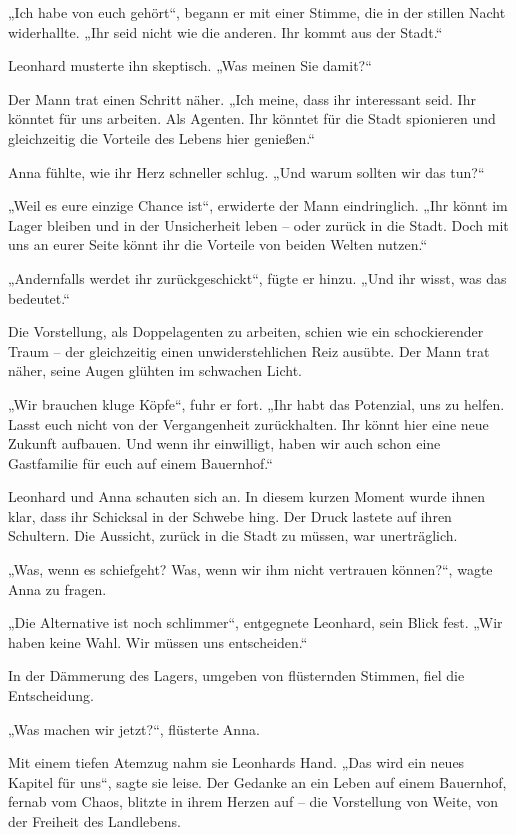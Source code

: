 \documentclass[
]{article}
\begin{document}
„Ich habe von euch gehört``, begann er mit einer Stimme, die in der stillen Nacht widerhallte. „Ihr seid nicht wie die anderen. Ihr kommt aus der Stadt.``

Leonhard musterte ihn skeptisch. „Was meinen Sie damit?{\kern0pt}``

Der Mann trat einen Schritt näher. „Ich meine, dass ihr interessant seid. Ihr könntet für uns arbeiten. Als Agenten. Ihr könntet für die Stadt spionieren und gleichzeitig die Vorteile des Lebens hier genießen.``

Anna fühlte, wie ihr Herz schneller schlug. „Und warum sollten wir das tun?{\kern0pt}``

„Weil es eure einzige Chance ist``, erwiderte der Mann eindringlich. „Ihr könnt im Lager bleiben und in der Unsicherheit leben -- oder zurück in die Stadt. Doch mit uns an eurer Seite könnt ihr die Vorteile von beiden Welten nutzen.``

„Andernfalls werdet ihr zurückgeschickt``, fügte er hinzu. „Und ihr wisst, was das bedeutet.``

Die Vorstellung, als Doppelagenten zu arbeiten, schien wie ein schockierender Traum -- der gleichzeitig einen unwiderstehlichen Reiz ausübte. Der Mann trat näher, seine Augen glühten im schwachen Licht.

„Wir brauchen kluge Köpfe``, fuhr er fort. „Ihr habt das Potenzial, uns zu helfen. Lasst euch nicht von der Vergangenheit zurückhalten. Ihr könnt hier eine neue Zukunft aufbauen. Und wenn ihr einwilligt, haben wir auch schon eine Gastfamilie für euch auf einem Bauernhof.``

Leonhard und Anna schauten sich an. In diesem kurzen Moment wurde ihnen klar, dass ihr Schicksal in der Schwebe hing. Der Druck lastete auf ihren Schultern. Die Aussicht, zurück in die Stadt zu müssen, war unerträglich.

„Was, wenn es schiefgeht? Was, wenn wir ihm nicht vertrauen können?{\kern0pt}``, wagte Anna zu fragen.

„Die Alternative ist noch schlimmer``, entgegnete Leonhard, sein Blick fest. „Wir haben keine Wahl. Wir müssen uns entscheiden.``

In der Dämmerung des Lagers, umgeben von flüsternden Stimmen, fiel die Entscheidung.

„Was machen wir jetzt?{\kern0pt}``, flüsterte Anna.

Mit einem tiefen Atemzug nahm sie Leonhards Hand. „Das wird ein neues Kapitel für uns``, sagte sie leise. Der Gedanke an ein Leben auf einem Bauernhof, fernab vom Chaos, blitzte in ihrem Herzen auf -- die Vorstellung von Weite, von der Freiheit des Landlebens.
\end{document}
